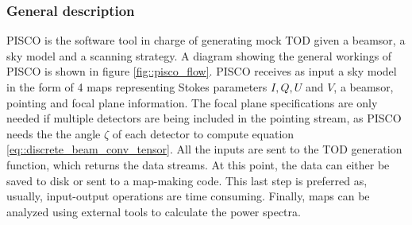 \documentclass[a4paper,fleqn]{cas-dc}\sloppy
\begin{document}
	\subsubsection{General description}
	
	PISCO is the software tool in charge of generating mock TOD given a beamsor, a sky model and a scanning strategy. A diagram showing the general workings of PISCO is shown in figure \ref{fig::pisco_flow}. PISCO receives as input a sky model in the form of 4 maps representing Stokes parameters $I,Q,U$ and $V$, a beamsor, pointing and focal plane information. The focal plane specifications are only needed if multiple detectors are being included in the pointing stream, as PISCO needs the the angle $\zeta$ of each detector to compute equation \ref{eq::discrete_beam_conv_tensor}. All the inputs are sent to the TOD generation function, which returns the data streams. At this point, the data can either be saved to disk or sent to a map-making code. This last step is preferred as, usually, input-output operations are time consuming. Finally, maps can be analyzed using external tools to calculate the power spectra.
	
\end{document}
